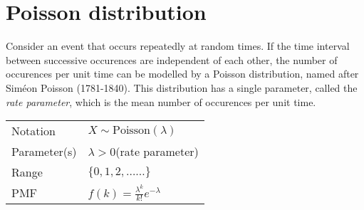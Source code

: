 %
%
%
%


\section{Poisson distribution}
Consider an event that occurs repeatedly at random times. If the time interval between successive occurences are independent of each other, the number of occurences per unit time can be modelled by a Poisson distribution, named after Sim\'{e}on Poisson (1781-1840). This distribution has a single parameter, called the \emph{rate parameter}, which is the mean number of occurences per unit time.

\begin{center}
\begin{tabular}{ll}\hline
Notation			& $X\sim\text{Poisson}(\lambda)$ \\
Parameter(s)	& $\lambda > 0$\quad (rate parameter) \\
Range				& $\{0,1,2,\ldots\ldots\}$ \\
PMF				& $f(k) = \displaystyle\frac{\lambda^k}{k!}e^{-\lambda}$ \\[2ex] \hline
\end{tabular}
\end{center}


